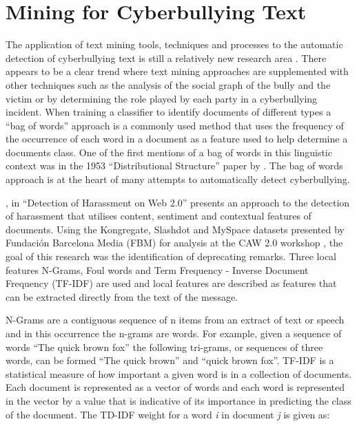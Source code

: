 \section{Mining for Cyberbullying Text}
\label{section:3.2}

The application of text mining tools, techniques and processes to the automatic detection of cyberbullying text is still a relatively new research area \cite{xu_fast_2012} \cite{xu_learning_2012}. There appears to be a clear trend where text mining approaches are supplemented with other techniques such as the analysis of the social graph of the bully and the victim or by determining the role played by each party in a cyberbullying incident. When training a classifier to identify documents of different types a ``bag of words'' approach is a commonly used method that uses the frequency of the occurrence of each word in a document as a feature used to help determine a documents class. One of the first mentions of a bag of words in this linguistic context was in the 1953 ``Distributional Structure'' paper by \citet{harris54}. The bag of words approach is at the heart of many attempts to automatically detect cyberbullying.

\citet{yin_detection_2009}, in ``Detection of Harassment on Web 2.0'' presents an approach to the detection of harassment that utilises content, sentiment and contextual features of documents. Using the Kongregate, Slashdot and MySpace datasets presented by Fundación Barcelona Media (FBM) for analysis at the CAW 2.0 workshop \cite{fundacion_barcelona_media_fbm_caw_2009}, the goal of this research was the identification of deprecating remarks. Three local features N-Grams, Foul words and Term Frequency - Inverse Document Frequency (TF-IDF) are used and local features are described as features that can be extracted directly from the text of the message. 

N-Grams are a contiguous sequence of n items from an extract of text or speech and in this occurrence the n-grams are words. For example, given a sequence of words ``The quick brown fox'' the following tri-grams, or sequences of three words, can be formed ``The quick brown'' and ``quick brown fox''. TF-IDF is a statistical measure of how important a given word is in a collection of documents. Each document is represented as a vector of words and each word is represented in the vector by a value that is indicative of its importance in predicting the class of the document. The TD-IDF weight for a word \textit{i} in document \textit{j} is given as: 

